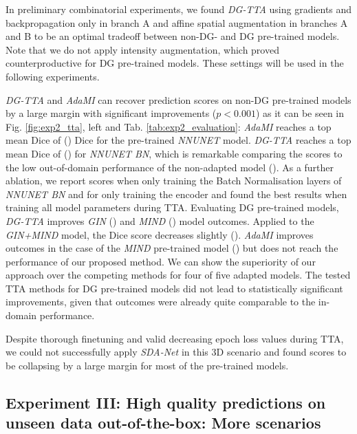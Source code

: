         In preliminary combinatorial experiments, we found \emph{DG-TTA} using gradients and backpropagation only in branch A and affine spatial augmentation in branches A and B to be an optimal tradeoff between non-DG-  and DG pre-trained models. Note that we do not apply intensity augmentation, which proved counterproductive for DG pre-trained models. These settings will be used in the following experiments.

        \emph{DG-TTA} and \emph{AdaMI} can recover prediction scores on non-DG pre-trained models by a large margin with significant improvements ($p<0.001$) as it can be seen in Fig. \ref{fig:exp2_tta}, left and Tab. \ref{tab:exp2_evaluation}: \emph{AdaMI} reaches a top mean Dice of  () Dice for the pre-trained \emph{NNUNET} model. \emph{DG-TTA} reaches a top mean Dice of  () for \emph{NNUNET BN}, which is remarkable comparing the scores to the low out-of-domain performance of the non-adapted model (). As a further ablation, we report scores when only training the Batch Normalisation layers of \emph{NNUNET BN} and for only training the encoder and found the best results when training all model parameters during TTA.
        Evaluating DG pre-trained models, \emph{DG-TTA} improves \emph{GIN} () and \emph{MIND} () model outcomes. Applied to the \emph{GIN+MIND} model, the Dice score decreases slightly (). \emph{AdaMI} improves outcomes in the case of the \emph{MIND} pre-trained model () but does not reach the performance of our proposed method. We can show the superiority of our approach over the competing methods for four of five adapted models. The tested TTA methods for DG pre-trained models did not lead to statistically significant improvements, given that outcomes were already quite comparable to the in-domain performance.

        Despite thorough finetuning and valid decreasing epoch loss values during TTA, we could not successfully apply \emph{SDA-Net} in this 3D scenario and found scores to be collapsing by a large margin for most of the pre-trained models.

    \subsection{Experiment III: High quality predictions on unseen data out-of-the-box: More scenarios}
        \label{sec:exp3_results}

